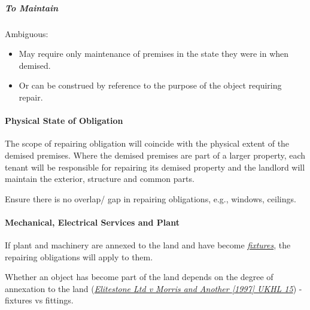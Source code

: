 \documentclass[
]{article}
\newenvironment{Shaded}{}{}
\newcommand{\NormalTok}[1]{#1}
\providecommand{\tightlist}{%
  \setlength{\itemsep}{0pt}\setlength{\parskip}{0pt}}
\begin{document}
\hypertarget{to-maintain}{%
\subparagraph{To Maintain}\label{to-maintain}}

Ambiguous:

\begin{itemize}
\tightlist
\item
  May require only maintenance of premises in the state they were in
  when demised.
\item
  Or can be construed by reference to the purpose of the object
  requiring repair.
\end{itemize}

\hypertarget{physical-state-of-obligation}{%
\paragraph{Physical State of
Obligation}\label{physical-state-of-obligation}}

The scope of repairing obligation will coincide with the physical extent
of the demised premises. Where the demised premises are part of a larger
property, each tenant will be responsible for repairing its demised
property and the landlord will maintain the exterior, structure and
common parts.

\begin{Shaded}
\begin{Highlighting}[]
\NormalTok{Ensure there is no overlap/ gap in repairing obligations, e.g., windows, ceilings. }
\end{Highlighting}
\end{Shaded}

\hypertarget{mechanical-electrical-services-and-plant}{%
\paragraph{Mechanical, Electrical Services and
Plant}\label{mechanical-electrical-services-and-plant}}

If plant and machinery are annexed to the land and have become
\emph{\href{https://uk.practicallaw.thomsonreuters.com/8-202-2732?originationContext=document\&transitionType=DocumentItem\&contextData=(sc.Default)\&ppcid=966adc813d44458ba2271293efe92ed6}{fixtures}},
the repairing obligations will apply to them.

Whether an object has become part of the land depends on the degree of
annexation to the land
(\emph{\href{https://uk.practicallaw.thomsonreuters.com/D-000-1799?originationContext=document\&transitionType=PLDocumentLink\&contextData=(sc.Default)\&ppcid=966adc813d44458ba2271293efe92ed6}{Elitestone
Ltd v Morris and Another {[}1997{]} UKHL 15}}) - fixtures vs fittings.
\end{document}
